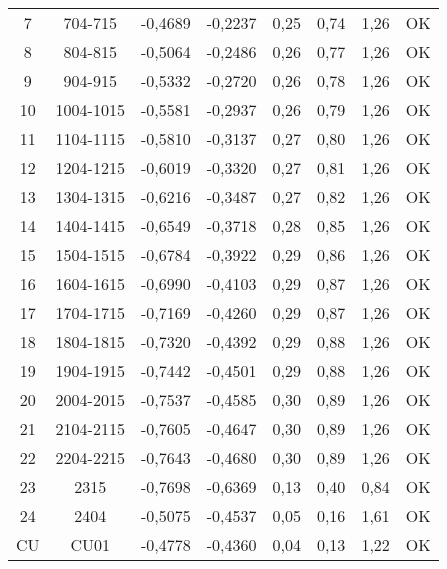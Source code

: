 \begin{table}[H]
{\begin{tabular}{cccccccc}
        7 &      704-715 &      -0,4689 &      -0,2237 &      0,25 &      0,74 &      1,26 &      OK      \\
        8 &      804-815 &      -0,5064 &      -0,2486 &      0,26 &      0,77 &      1,26 &      OK      \\
        9 &      904-915 &      -0,5332 &      -0,2720 &      0,26 &      0,78 &      1,26 &      OK      \\
        10 &      1004-1015 &      -0,5581 &      -0,2937 &      0,26 &      0,79 &      1,26 &      OK      \\
        11 &      1104-1115 &      -0,5810 &      -0,3137 &      0,27 &      0,80 &      1,26 &      OK      \\
        12 &      1204-1215 &      -0,6019 &      -0,3320 &      0,27 &      0,81 &      1,26 &      OK      \\
        13 &      1304-1315 &      -0,6216 &      -0,3487 &      0,27 &      0,82 &      1,26 &      OK      \\
        14 &      1404-1415 &      -0,6549 &      -0,3718 &      0,28 &      0,85 &      1,26 &      OK      \\
        15 &      1504-1515 &      -0,6784 &      -0,3922 &      0,29 &      0,86 &      1,26 &      OK      \\
        16 &      1604-1615 &      -0,6990 &      -0,4103 &      0,29 &      0,87 &      1,26 &      OK      \\
        17 &      1704-1715 &      -0,7169 &      -0,4260 &      0,29 &      0,87 &      1,26 &      OK      \\
        18 &      1804-1815 &      -0,7320 &      -0,4392 &      0,29 &      0,88 &      1,26 &      OK      \\
        19 &      1904-1915 &      -0,7442 &      -0,4501 &      0,29 &      0,88 &      1,26 &      OK      \\
        20 &      2004-2015 &      -0,7537 &      -0,4585 &      0,30 &      0,89 &      1,26 &      OK      \\
        21 &      2104-2115 &      -0,7605 &      -0,4647 &      0,30 &      0,89 &      1,26 &      OK      \\
        22 &      2204-2215 &      -0,7643 &      -0,4680 &      0,30 &      0,89 &      1,26 &      OK      \\
        23 &      2315 &      -0,7698 &      -0,6369 &      0,13 &      0,40 &      0,84 &      OK      \\
        24 &      2404 &      -0,5075 &      -0,4537 &      0,05 &      0,16 &      1,61 &      OK      \\
        CU &      CU01 &      -0,4778 &      -0,4360 &      0,04 &      0,13 &      1,22 &      OK      \bigstrut[b]\\
        \hline
      \end{tabular}
      }
      \label{deflosas}
    \end{table}

